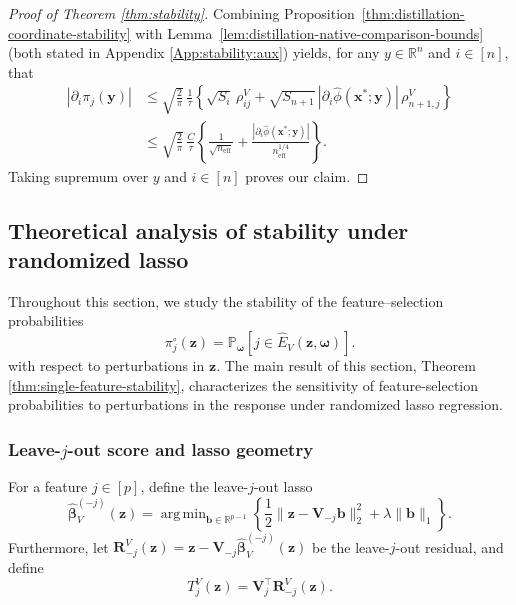 \documentclass[12pt]{article}
\newcommand{\R}{\mathbb{R}}
\DeclareMathOperator*{\argmin}{arg\,min}
\theoremstyle{definition}
\begin{document}
\begin{proof}[Proof of Theorem \ref{thm:stability}]
Combining Proposition~\ref{thm:distillation-coordinate-stability} with Lemma~\ref{lem:distillation-native-comparison-bounds} (both stated in Appendix \ref{App:stability:aux}) yields, for any $y\in \R^n$ and $i\in [n]$, that
\begin{align*}
|\partial_i \pi_j(\bm{y})|
&\le \sqrt{\frac{2}{\pi}}\,\frac{1}{\tau}
\left\{ \sqrt{S_i}\,\rho^{{V}}_{ij}
+ \sqrt{S_{n+1}}\,|\partial_i \hat\phi(\bm{x}^*; \bm{y})|\,\rho^{{V}}_{n+1,j} \right\} \\
&\le \sqrt{\frac{2}{\pi}}\,\frac{C}{\tau}
\left\{ \frac{1}{\sqrt{n_{\mathrm{eff}}}}
+ \frac{|\partial_i \hat\phi(\bm{x}^*; \bm{y})|}{n_{\mathrm{eff}}^{1/4}} \right\}.
\end{align*}
Taking supremum over $y$ and $i\in [n]$ proves our claim.
\end{proof}

\subsection{Theoretical analysis of stability under randomized lasso}
\label{App:stability:lasso}

Throughout this section, we study the stability of the feature--selection probabilities 
\[
    \pi_j^{\circ}(\boldsymbol z)
    =
    \mathbb P_{\boldsymbol\omega}
   \left[j\in\widehat E_V(\boldsymbol z,\boldsymbol\omega)\right].
\]
with respect to perturbations in $\bm{z}$.
The main result of this section, Theorem \ref{thm:single-feature-stability}, characterizes the sensitivity of feature-selection probabilities to perturbations in the response under randomized lasso regression.

\subsubsection{Leave-$j$-out score and lasso geometry}

For a feature $j\in[p]$, define the leave-$j$-out lasso
\begin{equation}
    \widehat{\boldsymbol\beta}_V^{(-j)}(\boldsymbol z)
    =
    \argmin_{\boldsymbol b\in\mathbb R^{p-1}}
    \left\{
        \frac12\|\boldsymbol z-\boldsymbol V_{-j}\boldsymbol b\|_2^2+\lambda\|\boldsymbol b\|_1
    \right\}.
    \label{eq:leave-j-out-lasso}
\end{equation}
Furthermore, let $\boldsymbol R_{-j}^V(\boldsymbol z)=\boldsymbol z-\boldsymbol V_{-j}\widehat{\boldsymbol\beta}_V^{(-j)}(\boldsymbol z)$
be the leave-$j$-out residual, and define
\begin{equation}
    T_j^V(\boldsymbol z)=\boldsymbol V_j^\top \boldsymbol R_{-j}^V(\boldsymbol z).
    \label{defn:Tj}
\end{equation}
\end{document}
